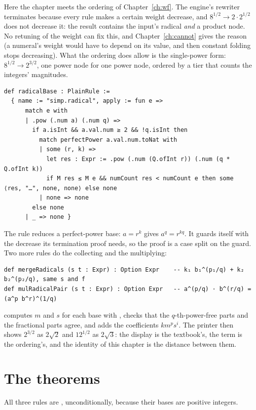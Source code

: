 Here the chapter meets the ordering of Chapter~\ref{ch:wf}. The engine's rewriter terminates
because every rule makes a certain weight decrease, and $8^{1/2} \to 2 \cdot 2^{1/2}$ does not
decrease it: the result contains the input's radical \emph{and} a product node. No retuning of
the weight can fix this, and Chapter~\ref{ch:cannot} gives the reason (a numeral's weight
would have to depend on its value, and then constant folding stops decreasing). What the ordering
does allow is the single-power form: $8^{1/2} \to 2^{3/2}$, one power node for one power node,
ordered by a tier that counts the integers' magnitudes.

\begin{verbatim}
def radicalBase : PlainRule :=
  { name := "simp.radical", apply := fun e =>
      match e with
      | .pow (.num a) (.num q) =>
        if a.isInt && a.val.num ≥ 2 && !q.isInt then
          match perfectPower a.val.num.toNat with
          | some (r, k) =>
            let res : Expr := .pow (.num (Q.ofInt r)) (.num (q * Q.ofInt k))
            if M res ≤ M e && numCount res < numCount e then some ⟨res, "…", none, none⟩ else none
          | none => none
        else none
      | _ => none }
\end{verbatim}

The rule reduces a perfect-power base: $a = r^k$ gives $a^{q} = r^{kq}$. It guards itself with the
decrease its termination proof needs, so the proof is a case split on the guard. Two more rules
do the collecting and the multiplying:

\begin{verbatim}
def mergeRadicals (s t : Expr) : Option Expr    -- k₁ b₁^(p₁/q) + k₂ b₂^(p₂/q), same s and f
def mulRadicalPair (s t : Expr) : Option Expr   -- a^(p/q) · b^(r/q) = (a^p b^r)^(1/q)
\end{verbatim}

 computes $m$ and $s$ for each base with , checks that the
$q$-th-power-free parts and the fractional parts agree, and adds the coefficients
$k m^p s^i$. The printer then shows $2^{3/2}$ as $2\sqrt 2$ and $12^{1/2}$ as $2\sqrt 3$: the
display is the textbook's, the term is the ordering's, and the identity of this chapter is the
distance between them.

\section{The theorems}

All three rules are , unconditionally, because their bases are positive integers.

